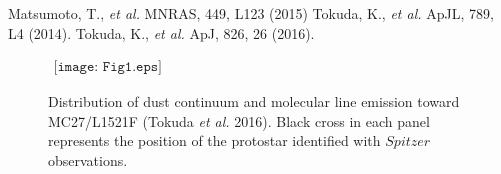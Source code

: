 \documentclass{article}
\begin{document}
\begin{thebibliography}
Matsumoto, T., {\it et al.} MNRAS, 449, L123 (2015)
Tokuda, K., {\it et al.} ApJL, 789, L4 (2014).
Tokuda, K., {\it et al.} ApJ, 826, 26 (2016).

\end{thebibliography}

\begin{figure}[h]
\vskip -0.5cm
\centering
$\begin{array}{cc}
\texttt{[image: Fig1.eps]} 
\end{array}$
\caption{Distribution of dust continuum and molecular line emission toward MC27/L1521F (Tokuda {\it et al.} 2016). Black cross in each panel represents the position of the protostar identified with $Spitzer$ observations.}
\label{fig:MC27}
\vskip -4.0cm
\end{figure}
\end{document}
